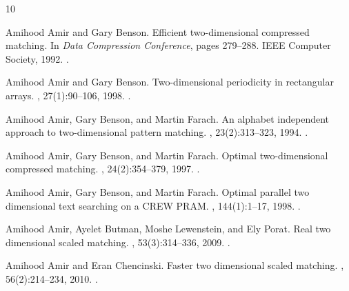 \documentclass[11pt,letterpaper]{article}
\begin{document}

\begin{thebibliography}{10}

Amihood Amir and Gary Benson.
\newblock Efficient two-dimensional compressed matching.
\newblock In {\em Data Compression Conference}, pages 279--288. {IEEE} Computer
  Society, 1992.
\newblock \href {https://doi.org/10.1109/DCC.1992.227453}
  {}.

Amihood Amir and Gary Benson.
\newblock Two-dimensional periodicity in rectangular arrays.
, 27(1):90--106, 1998.
\newblock \href {https://doi.org/10.1137/S0097539795298321}
  {}.

Amihood Amir, Gary Benson, and Martin Farach.
\newblock An alphabet independent approach to two-dimensional pattern matching.
, 23(2):313--323, 1994.
\newblock \href {https://doi.org/10.1137/S0097539792226321}
  {}.

Amihood Amir, Gary Benson, and Martin Farach.
\newblock Optimal two-dimensional compressed matching.
, 24(2):354--379, 1997.
\newblock \href {https://doi.org/10.1006/JAGM.1997.0860}
  {}.

Amihood Amir, Gary Benson, and Martin Farach.
\newblock Optimal parallel two dimensional text searching on a {CREW} {PRAM}.
, 144(1):1--17, 1998.
\newblock \href {https://doi.org/10.1006/INCO.1998.2705}
  {}.

Amihood Amir, Ayelet Butman, Moshe Lewenstein, and Ely Porat.
\newblock Real two dimensional scaled matching.
, 53(3):314--336, 2009.
\newblock \href {https://doi.org/10.1007/S00453-007-9021-X}
  {}.

Amihood Amir and Eran Chencinski.
\newblock Faster two dimensional scaled matching.
, 56(2):214--234, 2010.
\newblock \href {https://doi.org/10.1007/S00453-008-9173-3}
  {}.


\end{thebibliography}
\end{document}
